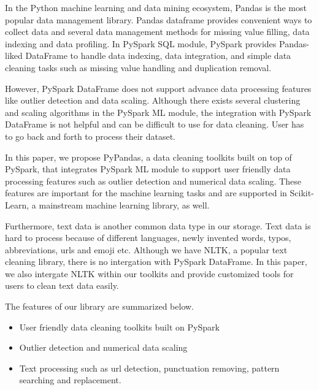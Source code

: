 \documentclass[sigconf]{acmart}
\begin{document}
In the Python machine learning and data mining ecosystem, Pandas\cite{pandas} is the most popular data management library. Pandas dataframe provides convenient ways to collect data and several data management methods for missing value filling, data indexing and data profiling. In PySpark SQL module, PySpark provides Pandas-liked DataFrame to handle data indexing, data integration, and simple data cleaning tasks such as missing value handling and duplication removal.
	
However, PySpark DataFrame does not support advance data processing features like outlier detection and data scaling. Although there exists several clustering and scaling algorithms in the PySpark ML module, the integration with PySpark DataFrame is not helpful and can be difficult to use for data cleaning. User has to go back and forth to process their dataset.  

In this paper, we propose PyPandas, a data cleaning toolkits built on top of PySpark, that integrates PySpark ML module to support user friendly data processing features such as outlier detection and numerical data scaling. These features are important for the machine learning tasks and are supported in Scikit-Learn\cite{scikit-learn}, a mainstream machine learning library, as well.
	
Furthermore, text data is another common data type in our storage. Text data is hard to process because of different languages, newly invented words, typos, abbreviations, urls and emoji etc. Although we have NLTK\cite{nltk}, a popular text cleaning library, there is no intergation with PySpark DataFrame. In this paper, we also intergate NLTK within our toolkits and provide customized tools for users to clean text data easily. 
	
The features of our library are summarized below.
\begin{itemize}
	\item{User friendly data cleaning toolkits built on PySpark}
	\item{Outlier detection and numerical data scaling}
	\item{Text processing such as url detection, punctuation removing, pattern searching and replacement. }
\end{itemize}	
\end{document}
